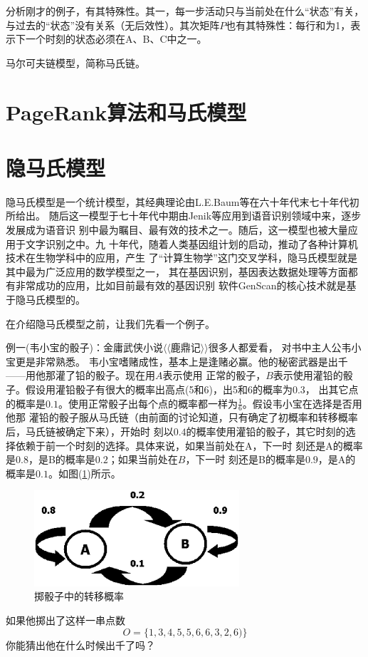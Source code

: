 分析刚才的例子，有其特殊性。其一，每一步活动只与当前处在什么“状态”有关，
与过去的“状态”没有关系（无后效性）。其次矩阵$P$也有其特殊性：每行和为1，表示下一个时刻的状态必须在A、B、C中之一。

马尔可夫链模型，简称马氏链。

\section{PageRank算法和马氏模型}


\section{隐马氏模型}

隐马氏模型是一个统计模型，其经典理论由L.E.Baum等在六十年代末七十年代初所给出。
随后这一模型于七十年代中期由Jenik等应用到语音识别领域中来，逐步发展成为语音识
别中最为瞩目、最有效的技术之一。随后，这一模型也被大量应用于文字识别之中。九
十年代，随着人类基因组计划的启动，推动了各种计算机技术在生物学科中的应用，产生
了“计算生物学”这门交叉学科，隐马氏模型就是其中最为广泛应用的数学模型之一，
其在基因识别，基因表达数据处理等方面都有非常成功的应用，比如目前最有效的基因识别
软件GenScan的核心技术就是基于隐马氏模型的。


在介绍隐马氏模型之前，让我们先看一个例子。

例一(韦小宝的骰子)：金庸武侠小说$\langle\!\langle$鹿鼎记$\rangle\!\rangle$很多人都爱看，
对书中主人公韦小宝更是非常熟悉。
韦小宝嗜赌成性，基本上是逢赌必赢。他的秘密武器是出千——用他那灌了铅的骰子。现在用$A$表示使用
正常的骰子，$B$表示使用灌铅的骰子。假设用灌铅骰子有很大的概率出高点(5和6)，出5和6的概率为$0.3$，
出其它点的概率是$0.1$。使用正常骰子出每个点的概率都一样为$\frac{1}{6}$。假设韦小宝在选择是否用他那
灌铅的骰子服从马氏链（由前面的讨论知道，只有确定了初概率和转移概率后，马氏链被确定下来），开始时
刻以$0.4$的概率使用灌铅的骰子，其它时刻的选择依赖于前一个时刻的选择。具体来说，如果当前处在A，下一时
刻还是A的概率是$0.8$，是B的概率是$0.2$；如果当前处在$B$，下一时
刻还是B的概率是$0.9$，是A的概率是$0.1$。如图(\ref{Fig:DiceTransitionProbability})所示。
\begin{figure}[ht]
\centering
\includegraphics[width=3in]{DiceTransitionProbability.eps}
\caption{掷骰子中的转移概率}
\label{Fig:DiceTransitionProbability}
\end{figure}
如果他掷出了这样一串点数
$$
O=\{1,3,4,5,5,6,6,3,2,6)\}
$$
你能猜出他在什么时候出千了吗？


